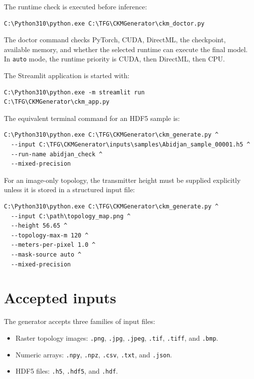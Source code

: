 The runtime check is executed before inference:

{\scriptsize
\begin{verbatim}
C:\Python310\python.exe C:\TFG\CKMGenerator\ckm_doctor.py
\end{verbatim}
}

The doctor command checks PyTorch, CUDA, DirectML, the checkpoint, available
memory, and whether the selected runtime can execute the final model. In
\texttt{auto} mode, the runtime priority is CUDA, then DirectML, then CPU.

The Streamlit application is started with:

{\scriptsize
\begin{verbatim}
C:\Python310\python.exe -m streamlit run C:\TFG\CKMGenerator\ckm_app.py
\end{verbatim}
}

The equivalent terminal command for an HDF5 sample is:

{\scriptsize
\begin{verbatim}
C:\Python310\python.exe C:\TFG\CKMGenerator\ckm_generate.py ^
  --input C:\TFG\CKMGenerator\inputs\samples\Abidjan_sample_00001.h5 ^
  --run-name abidjan_check ^
  --mixed-precision
\end{verbatim}
}

For an image-only topology, the transmitter height must be supplied explicitly
unless it is stored in a structured input file:

{\scriptsize
\begin{verbatim}
C:\Python310\python.exe C:\TFG\CKMGenerator\ckm_generate.py ^
  --input C:\path\topology_map.png ^
  --height 56.65 ^
  --topology-max-m 120 ^
  --meters-per-pixel 1.0 ^
  --mask-source auto ^
  --mixed-precision
\end{verbatim}
}

\section{Accepted inputs}

The generator accepts three families of input files:

\begin{itemize}
\setlength\itemsep{0.15em}
  \item Raster topology images: \texttt{.png}, \texttt{.jpg},
        \texttt{.jpeg}, \texttt{.tif}, \texttt{.tiff}, and \texttt{.bmp}.
  \item Numeric arrays: \texttt{.npy}, \texttt{.npz}, \texttt{.csv},
        \texttt{.txt}, and \texttt{.json}.
  \item HDF5 files: \texttt{.h5}, \texttt{.hdf5}, and \texttt{.hdf}.
\end{itemize}

